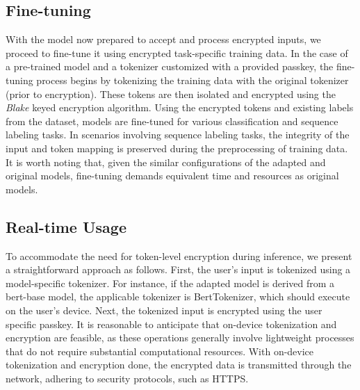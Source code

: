 \documentclass[letterpaper]{article} %
\begin{document}
\subsection{Fine-tuning}
With the model now prepared to accept and process encrypted inputs, we proceed to fine-tune it using encrypted task-specific training data. In the case of a pre-trained model and a tokenizer customized with a provided passkey, the fine-tuning process begins by tokenizing the training data with the original tokenizer (prior to encryption). These tokens are then isolated and encrypted using the \textit{Blake} keyed encryption algorithm. Using the encrypted tokens and existing labels from the dataset, models are fine-tuned for various classification and sequence labeling tasks.  In scenarios involving sequence labeling tasks, the integrity of the input and token mapping is preserved during the preprocessing of training data. It is worth noting that, given the similar configurations of the adapted and original models, fine-tuning demands equivalent time and resources as original models.
\subsection{Real-time Usage}
To accommodate the need for token-level encryption during inference, we present a straightforward approach as follows. First, the user's input is tokenized using a model-specific tokenizer. For instance, if the adapted model is derived from a bert-base model, the applicable tokenizer is BertTokenizer, which should execute on the user's device. Next, the tokenized input is encrypted using the user specific passkey. It is reasonable to anticipate that on-device tokenization and encryption are feasible, as these operations generally involve lightweight processes that do not require substantial computational resources. With on-device tokenization and encryption done, the encrypted data is transmitted through the network, adhering to security protocols, such as HTTPS.
\end{document}
